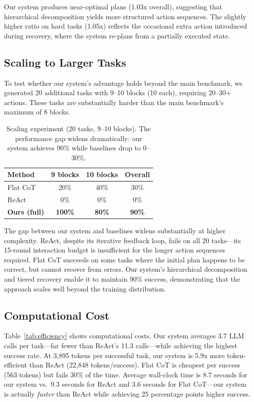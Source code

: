 \documentclass{article}
\begin{document}
Our system produces near-optimal plans (1.03x overall), suggesting that hierarchical decomposition yields more structured action sequences. The slightly higher ratio on hard tasks (1.05x) reflects the occasional extra action introduced during recovery, where the system re-plans from a partially executed state.

\subsection{Scaling to Larger Tasks}

To test whether our system's advantage holds beyond the main benchmark, we generated 20 additional tasks with 9--10 blocks (10 each), requiring 20--30+ actions. These tasks are substantially harder than the main benchmark's maximum of 8 blocks.

\begin{table}[h]
\centering
\begin{tabular}{lccc}
\toprule
\textbf{Method} & \textbf{9 blocks} & \textbf{10 blocks} & \textbf{Overall} \\
\midrule
Flat CoT & 20\% & 40\% & 30\% \\
ReAct & 0\% & 0\% & 0\% \\
\textbf{Ours (full)} & \textbf{100\%} & \textbf{80\%} & \textbf{90\%} \\
\bottomrule
\end{tabular}
\caption{Scaling experiment (20 tasks, 9--10 blocks). The performance gap widens dramatically: our system achieves 90\% while baselines drop to 0--30\%.}
\label{tab:scaling}
\end{table}

The gap between our system and baselines widens substantially at higher complexity. ReAct, despite its iterative feedback loop, fails on all 20 tasks---its 15-round interaction budget is insufficient for the longer action sequences required. Flat CoT succeeds on some tasks where the initial plan happens to be correct, but cannot recover from errors. Our system's hierarchical decomposition and tiered recovery enable it to maintain 90\% success, demonstrating that the approach scales well beyond the training distribution.

\subsection{Computational Cost}

Table~\ref{tab:efficiency} shows computational costs. Our system averages 3.7 LLM calls per task---far fewer than ReAct's 11.3 calls---while achieving the highest success rate. At 3,895 tokens per successful task, our system is 5.9x more token-efficient than ReAct (22,848 tokens/success). Flat CoT is cheapest per success (563 tokens) but fails 30\% of the time. Average wall-clock time is 8.7 seconds for our system vs.\ 9.3 seconds for ReAct and 3.6 seconds for Flat CoT---our system is actually \textit{faster} than ReAct while achieving 25 percentage points higher success.
\end{document}

